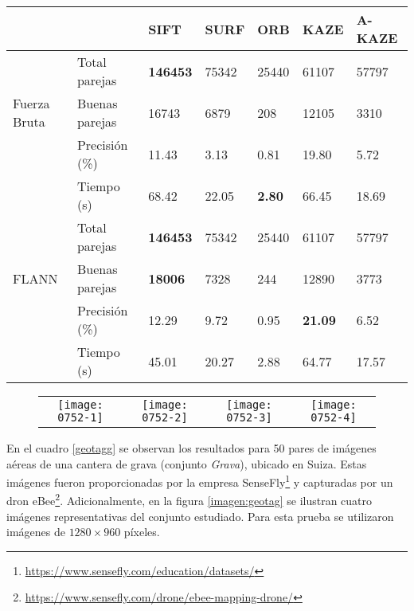 \begin{table}[h]
	\centering
	\label{0752-2}
	\renewcommand{\arraystretch}{0.8}%
	\begin{tabular}{@{}lllllll@{}}
		\toprule
		&                      				& SIFT 			& SURF & ORB 		& KAZE 				& A-KAZE  \\ \midrule 
		\hfill\vline& Total parejas  &\textbf{146453}		& 75342&25440		&61107 				& 57797   \\
		Fuerza Bruta \vline& Buenas parejas & 16743			& 6879 & 208 		& 12105 			& 3310    \\
		\hfill\vline& Precisión (\%) & 11.43				&3.13  &0.81		& 19.80 			& 5.72  \\
		\vspace{0.3cm}
		\hfill\vline& Tiempo (s)     & 68.42				&22.05 & \textbf{2.80} &66.45       & 18.69   \\
		
		\hfill\vline& Total parejas  &\textbf{146453}& 75342&25440			&61107 				& 57797   \\
		FLANN  \hfill\vline& Buenas parejas &\textbf{18006} & 7328 & 244 			& 12890 			& 3773    \\
		\hfill\vline& Precisión (\%) & 12.29				& 9.72 &0.95  			& \textbf{21.09} 	& 6.52    \\ 
		\hfill\vline& Tiempo (s)     & 45.01				& 20.27& 2.88			& 64.77				& 17.57   \\ 
		\bottomrule
	\end{tabular}
\end{table}

\begin{figure}[h]
	\centering
	\vspace{0.6cm}
	\begin{tabular}{@{}cccc@{}}
		\texttt{[image: 0752-1]} &
		\texttt{[image: 0752-2]} &
		\texttt{[image: 0752-3]} &
		\texttt{[image: 0752-4]} 
	\end{tabular}
	\label{imagen:0752}
\end{figure}

En el cuadro \ref{geotagg} se observan los resultados para 50 pares de imágenes aéreas de una cantera de grava (conjunto \textit{Grava}), ubicado en Suiza. Estas imágenes fueron proporcionadas por la empresa SenseFly\footnote{\url{https://www.sensefly.com/education/datasets/}} y capturadas por un dron eBee\footnote{\url{https://www.sensefly.com/drone/ebee-mapping-drone/}}.  Adicionalmente, en la figura \ref{imagen:geotag} se ilustran cuatro imágenes representativas del conjunto estudiado. Para esta prueba se utilizaron imágenes de $1280\times960$ píxeles.

